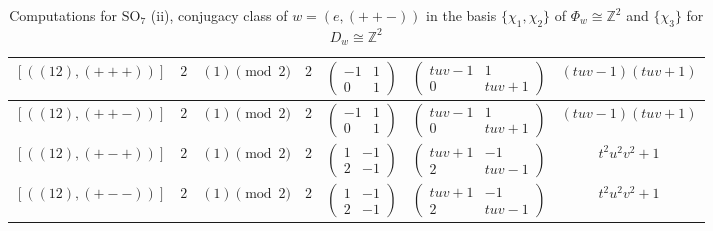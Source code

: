 \documentclass[11pt,english]{amsart}
\numberwithin{equation}{section}
\numberwithin{figure}{section}
\theoremstyle{plain}
\theoremstyle{plain}
\theoremstyle{definition}
\theoremstyle{remark}
\begin{document}
\begin{itemize}
\begin{table}[H]
\begin{tabular}{|c|c|c|c|c|c|c|}
        $[ ((12), (+++)) ]$ & $2$ & $(1)\pmod 2$ & $2$ & 
        $\begin{pmatrix} -1 & 1 \\ 0 & 1 \end{pmatrix}$ & 
        $\begin{pmatrix} tuv-1 & 1 \\ 0 & tuv+1 \end{pmatrix}$ & 
        $(tuv-1)(tuv+1)$ \\\hline
        
        $[ ((12), (++-)) ]$ & $2$ & $(1)\pmod 2$ & $2$ & 
        $\begin{pmatrix} -1 & 1 \\ 0 & 1 \end{pmatrix}$ & 
        $\begin{pmatrix} tuv-1 & 1 \\ 0 & tuv+1 \end{pmatrix}$ & 
        $(tuv-1)(tuv+1)$ \\\hline
        
        $[ ((12), (+-+)) ]$ & $2$ & $(1)\pmod 2$ & $2$ & 
        $\begin{pmatrix} 1 & -1 \\ 2 & -1 \end{pmatrix}$ & 
        $\begin{pmatrix} tuv+1 & -1 \\ 2 & tuv-1 \end{pmatrix}$ & 
        $t^2 u^2 v^2 + 1$ \\\hline
        
        $[ ((12), (+--)) ]$ & $2$ & $(1)\pmod 2$ & $2$ & 
        $\begin{pmatrix} 1 & -1 \\ 2 & -1 \end{pmatrix}$ & 
        $\begin{pmatrix} tuv+1 & -1 \\ 2 & tuv-1 \end{pmatrix}$ & 
        $t^2 u^2 v^2 + 1$ \\\hline
    \end{tabular}
    \caption{Computations for $\mathrm{SO}_7$ (ii), conjugacy class of $w=(e, (++-))$ in the basis $\{\chi_1, \chi_2\}$ of $\Phi_w\cong \mathbb{Z}^2$ and $\{\chi_3\}$ for $D_w\cong \mathbb{Z}^2$}
    \label{tab:SO7_ii}
\end{table}


\end{itemize}
\end{document}
